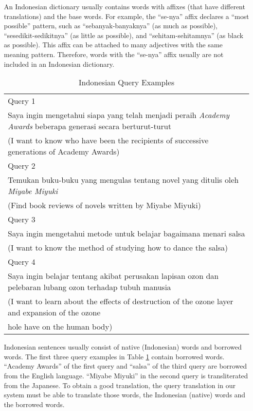 \documentclass[english]{jnlp_1.3c}
\begin{document}
An Indonesian dictionary usually contains words with affixes (that have
different translations) and the base words. For example, the ``se-nya''
affix declares a ``most possible'' pattern, such as ``sebanyak-banyaknya''
(as much as possible), ``sesedikit-sedikitnya'' (as little as
possible), and ``sehitam-sehitamnya'' (as black as possible). This affix
can be attached to many adjectives with the same meaning
pattern. Therefore, words with the ``se-nya'' affix usually are not
included in an Indonesian dictionary.

\begin{table}[b]
  \caption{Indonesian Query Examples}
  \label{table:Indonesian Query Examples}
  \begin{center}
    \begin{tabular}{|p{}|}\hline
     Query 1 \\
     Saya ingin mengetahui siapa yang telah menjadi peraih {\it Academy Awards}
     beberapa generasi secara berturut-turut \\
     (I want to know who have been the recipients of successive
     generations of Academy Awards) \\ \hline
     Query 2 \\
     Temukan buku-buku yang mengulas tentang novel yang ditulis oleh
     {\it Miyabe Miyuki} \\
     (Find book reviews of novels written by Miyabe Miyuki) \\ \hline
     Query 3\\
     Saya ingin mengetahui metode untuk belajar bagaimana menari salsa
     \\
     (I want to know the method of studying how to dance the salsa) \\
     \hline
     Query 4\\
     Saya ingin belajar tentang akibat perusakan lapisan ozon dan
     pelebaran lubang ozon terhadap tubuh manusia \\
     (I want to learn about the effects of destruction of the ozone layer
     and expansion of the ozone \\ hole have on the human body) \\ \hline
    \end{tabular}
  \end{center}
\vspace{-1\baselineskip}
\end{table}

Indonesian sentences usually consist of native (Indonesian) words and
borrowed words. The first three query examples in Table
\ref{table:Indonesian Query Examples} contain borrowed words. ``Academy
Awards'' of the first query and ``salsa'' of the third query are
borrowed from the English language. ``Miyabe Miyuki'' in the second
query is transliterated from the Japanese. To obtain a good translation,
the query translation in our system must be able to translate those
words, the Indonesian (native) words and the borrowed words.
\end{document}
